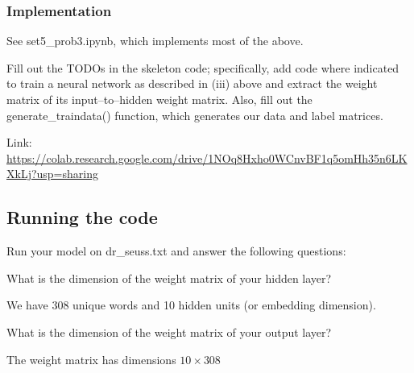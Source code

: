 \subsubsection{Implementation}

See set5_prob3.ipynb, which implements most of the above.

\problem[10]
Fill out the TODOs in the skeleton code; specifically, add code where indicated to train a neural network as described in (iii) above and extract the weight matrix of its input--to--hidden weight matrix. Also, fill out the generate\_traindata() function, which generates our data and label matrices.


\begin{solution}
 Link: \url{https://colab.research.google.com/drive/1NOq8Hxho0WCnvBF1q5omHh35n6LKXkLj?usp=sharing}
\end{solution}

\subsection{Running the code}
Run your model on dr_seuss.txt and answer the following questions:

\problem[2]
What is the dimension of the weight matrix of your hidden layer?

\begin{solution}
 We have 308 unique words and 10 hidden units (or embedding dimension).
\end{solution}

\problem[2]
What is the dimension of the weight matrix of your output layer?
\begin{solution}
 The weight matrix has dimensions $10\times 308$
\end{solution}


